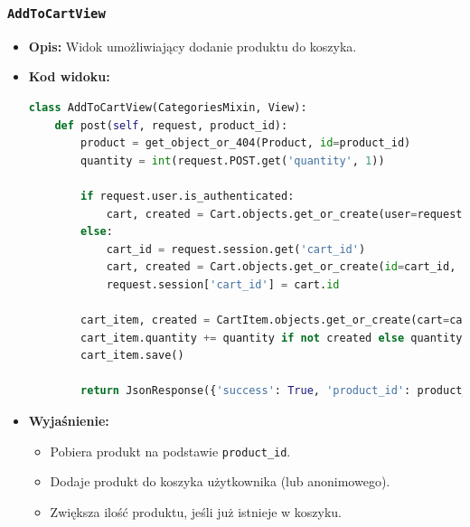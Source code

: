 \documentclass[12pt,a4paper,oneside]{article}
\theoremstyle{definition}
\numberwithin{equation}{section}
\begin{document}
\subsubsection*{\texttt{AddToCartView}}
\begin{itemize}
    \item \textbf{Opis:} Widok umożliwiający dodanie produktu do koszyka.
    \item \textbf{Kod widoku:}
\begin{lstlisting}[language=Python, caption=\texttt{AddToCartView}]
class AddToCartView(CategoriesMixin, View):
    def post(self, request, product_id):
        product = get_object_or_404(Product, id=product_id)
        quantity = int(request.POST.get('quantity', 1))

        if request.user.is_authenticated:
            cart, created = Cart.objects.get_or_create(user=request.user)
        else:
            cart_id = request.session.get('cart_id')
            cart, created = Cart.objects.get_or_create(id=cart_id, user=None) if cart_id else Cart.objects.create(user=None)
            request.session['cart_id'] = cart.id

        cart_item, created = CartItem.objects.get_or_create(cart=cart, product=product)
        cart_item.quantity += quantity if not created else quantity
        cart_item.save()

        return JsonResponse({'success': True, 'product_id': product_id, 'quantity': cart_item.quantity})
\end{lstlisting}

    \item \textbf{Wyjaśnienie:}
    \begin{itemize}
        \item Pobiera produkt na podstawie \texttt{product\_id}.
        \item Dodaje produkt do koszyka użytkownika (lub anonimowego).
        \item Zwiększa ilość produktu, jeśli już istnieje w koszyku.
    \end{itemize}
\end{itemize}
\end{document}
